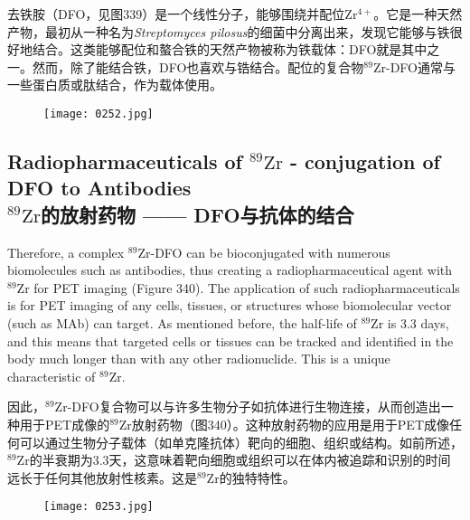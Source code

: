 \documentclass[dvipsnames, svgnames,a4paper,11pt]{article}
\begin{document}
去铁胺（DFO，见图339）是一个线性分子，能够围绕并配位\(\mathrm{Zr^{4+}}\)。它是一种天然产物，最初从一种名为\textit{Streptomyces pilosus}的细菌中分离出来，发现它能够与铁很好地结合。这类能够配位和螯合铁的天然产物被称为铁载体：DFO就是其中之一。然而，除了能结合铁，DFO也喜欢与锆结合。配位的复合物\(\mathrm{^{89}Zr}\)-DFO通常与一些蛋白质或肽结合，作为载体使用。

\begin{figure}[h]
	\centering
    \texttt{[image: 0252.jpg]}  
     \label{fig339}
\end{figure}


\subsection{Radiopharmaceuticals of \(\mathrm{^{89}Zr}\) - conjugation of DFO to Antibodies\\ \(\mathrm{^{89}Zr}\)的放射药物 —— DFO与抗体的结合}  

Therefore, a complex \(\mathrm{^{89}Zr}\)-DFO can be bioconjugated with numerous biomolecules such as antibodies, thus creating a radiopharmaceutical agent with \(\mathrm{^{89}Zr}\) for PET imaging (Figure 340). The application of such radiopharmaceuticals is for PET imaging of any cells, tissues, or structures whose biomolecular vector (such as MAb) can target. As mentioned before, the half-life of \(\mathrm{^{89}Zr}\) is 3.3 days, and this means that targeted cells or tissues can be tracked and identified in the body much longer than with any other radionuclide. This is a unique characteristic of \(\mathrm{^{89}Zr}\).

因此，\(\mathrm{^{89}Zr}\)-DFO复合物可以与许多生物分子如抗体进行生物连接，从而创造出一种用于PET成像的\(\mathrm{^{89}Zr}\)放射药物（图340）。这种放射药物的应用是用于PET成像任何可以通过生物分子载体（如单克隆抗体）靶向的细胞、组织或结构。如前所述，\(\mathrm{^{89}Zr}\)的半衰期为3.3天，这意味着靶向细胞或组织可以在体内被追踪和识别的时间远长于任何其他放射性核素。这是\(\mathrm{^{89}Zr}\)的独特特性。

\begin{figure}[h]
	\centering
    \texttt{[image: 0253.jpg]}  
     \label{fig340}
\end{figure}
\end{document}

